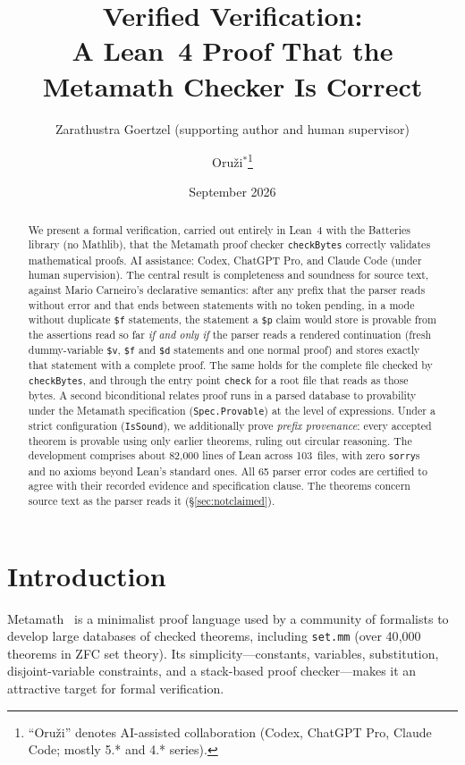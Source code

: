 \documentclass[11pt]{article}
\title{Verified Verification:\\
A Lean~4 Proof That the Metamath Checker Is Correct}
\author{
  Zarathustra Goertzel (supporting author and human supervisor)
  \and
  Oru\v{z}i$^\ast$\footnote{``Oru\v{z}i'' denotes AI-assisted collaboration (Codex, ChatGPT Pro, Claude Code; mostly 5.* and 4.* series).}
}
\date{September 2026}
\newcommand{\lean}[1]{\lstinline[language=Lean4]{#1}}
\begin{document}
\maketitle

\begin{abstract}
We present a formal verification, carried out entirely in Lean~4 with
the Batteries library (no Mathlib), that the Metamath proof checker
\lean{checkBytes} correctly validates mathematical proofs.
AI assistance: Codex, ChatGPT Pro, and Claude Code (under human supervision).
The central result is completeness and soundness for source text,
against Mario Carneiro's declarative semantics: after any prefix that the
parser reads without error and that ends between statements with no token
pending, in a mode without duplicate \verb|$f| statements, the statement a \verb|$p| claim
would store is provable from the assertions read so far \emph{if and only
if} the parser reads a rendered continuation
(fresh dummy-variable \verb|$v|, \verb|$f| and \verb|$d| statements and one
normal proof) and stores exactly that statement with a complete proof.
The same holds for the complete file checked by \lean{checkBytes}, and
through the entry point \lean{check} for a root file that reads as those
bytes.
A second biconditional relates proof runs in a parsed database to
provability under the Metamath specification (\lean{Spec.Provable}) at the
level of expressions.
Under a strict configuration (\lean{IsSound}), we additionally prove
\emph{prefix provenance}: every accepted theorem is provable using only
earlier theorems, ruling out circular reasoning.
The development comprises about 82{,}000 lines of Lean across 103~files,
with zero \lean{sorry}s and no axioms beyond Lean's standard ones.
All 65 parser error codes are certified to agree with their recorded evidence and specification clause.
The theorems concern source text as the parser reads it
(\S\ref{sec:notclaimed}).
\end{abstract}

\tableofcontents

\section{Introduction}
\label{sec:intro}

Metamath~\cite{megill2019} is a minimalist proof language used by a
community of formalists to develop large databases of checked theorems,
including \texttt{set.mm} (over 40{,}000 theorems in ZFC set theory).
Its simplicity---constants, variables, substitution, disjoint-variable
constraints, and a stack-based proof checker---makes it an attractive
target for formal verification.
\end{document}
